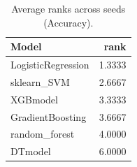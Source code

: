 \begin{table}[t]
\centering
\begin{tabular}{lr}
\toprule
Model & rank \\
\midrule
LogisticRegression & 1.3333 \\
sklearn_SVM & 2.6667 \\
XGBmodel & 3.3333 \\
GradientBoosting & 3.6667 \\
random_forest & 4.0000 \\
DTmodel & 6.0000 \\
\bottomrule
\end{tabular}
\caption{Average ranks across seeds (Accuracy).}
\label{tab:avg_rank_Accuracy}
\end{table}